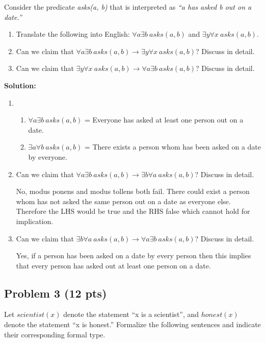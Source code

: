 \documentclass[12pt]{article}
\begin{document}
Consider the predicate \textit{asks(a, b)} that is interpreted as \textit{``a has asked b out on a date.''}
\begin{enumerate}
\item Translate the following into English: $\forall a \exists b~asks(a, b)$ and $\exists y \forall x ~asks(a, b)$.
\item Can we claim that $\forall a \exists b~asks(a, b) \rightarrow \exists y \forall x ~asks(a, b)$? Discuss in detail.
\item Can we claim that $\exists y \forall x ~asks(a, b) \rightarrow \forall a \exists b~asks(a, b)$? Discuss in detail.
\end{enumerate}

\bigskip
\noindent \textbf{Solution:}
\begin{enumerate}
\item \begin{enumerate}
\item $\forall a \exists b~asks(a, b)$ = Everyone has asked at least one person out on a date.
\item $\exists a \forall b ~asks(a, b)$ = There exists a person whom has been asked on a date by everyone.
\end{enumerate}
\item Can we claim that $\forall a \exists b~asks(a, b) \rightarrow \exists b \forall a ~asks(a, b)$? Discuss in detail.

No, modus ponens and modus tollens both fail. There could exist a person whom has not asked the same person out on a date as everyone else. Therefore the LHS
would be true and the RHS false which cannot hold for implication.

\item Can we claim that $\exists b \forall a ~asks(a, b) \rightarrow \forall a \exists b~asks(a, b)$? Discuss in detail.

Yes, if a person has been asked on a date by every person then this implies that every person has asked out at least one person on a date.
\end{enumerate}




\newpage

\subsection{Problem 3 (12 pts)}

\noindent Let $scientist(x)$ denote the statement ``x is a scientist'', and $honest(x)$ denote the statement ``x is honest.'' Formalize the following sentences and indicate their corresponding formal type.
\end{document}
